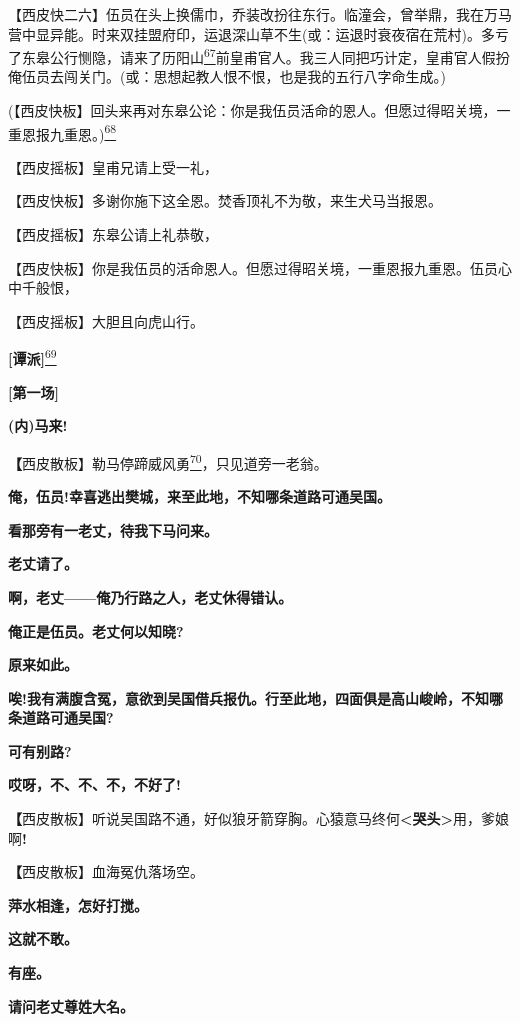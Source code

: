 【西皮快二六】伍员在头上换儒巾，乔装改扮往东行。临潼会，曾举鼎，我在万马营中显异能。时来双挂盟府印，运退深山草不生(或：运退时衰夜宿在荒村)。多亏了东皋公行恻隐，请来了历阳山\protect\hyperlink{fn67}{\textsuperscript{67}}前皇甫官人。我三人同把巧计定，皇甫官人假扮俺伍员去闯关门。(或：思想起教人恨不恨，也是我的五行八字命生成。)

(【西皮快板】回头来再对东皋公论：你是我伍员活命的恩人。但愿过得昭关境，一重恩报九重恩。)\protect\hyperlink{fn68}{\textsuperscript{68}}

【西皮摇板】皇甫兄请上受一礼，

【西皮快板】多谢你施下这全恩。焚香顶礼不为敬，来生犬马当报恩。

【西皮摇板】东皋公请上礼恭敬，

【西皮快板】你是我伍员的活命恩人。但愿过得昭关境，一重恩报九重恩。伍员心中千般恨，

【西皮摇板】大胆且向虎山行。

\textbf{{[}谭派{]}}\protect\hyperlink{fn69}{\textsuperscript{69}}

\textbf{{[}第一场{]}}

\textbf{(内)马来!}

\textbf{【}西皮散板】勒马停蹄威风勇\protect\hyperlink{fn70}{\textsuperscript{70}}，只见道旁一老翁。

\textbf{俺，伍员!幸喜逃出樊城，来至此地，不知哪条道路可通吴国。}

\textbf{看那旁有一老丈，待我下马问来。}

\textbf{老丈请了。}

\textbf{啊，老丈------俺乃行路之人，老丈休得错认。}

\textbf{俺正是伍员。老丈何以知晓?}

\textbf{原来如此。}

\textbf{唉!我有满腹含冤，意欲到吴国借兵报仇。行至此地，四面俱是高山峻岭，不知哪条道路可通吴国?}

\textbf{可有别路?}

\textbf{哎呀，不、不、不，不好了!}

\textbf{【}西皮散板】听说吴国路不通，好似狼牙箭穿胸。心猿意马终何\textbf{\textless{}哭头\textgreater{}}用，爹娘啊\textbf{!}

\textbf{【}西皮散板】血海冤仇落场空。

\textbf{萍水相逢，怎好打搅。}

\textbf{这就不敢。}

\textbf{有座。}

\textbf{请问老丈尊姓大名。}

